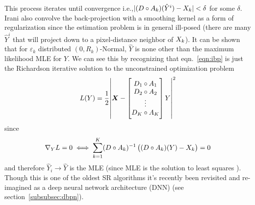 %
This process iterates until convergence i.e.,\(\lvert (D \circ A_k)(\hat{Y}^i) - X_k \rvert < \delta\) for some \(\delta\).
%
Irani \etal \cite{Irani1991ImprovingRB} also convolve the back-projection with a smoothing kernel as a form of regularization since the estimation problem is in general ill-posed (there are many \(\hat{Y}^{i}\) that will project down to a pixel-distance neighbor of \(X_k\)).
%
It can be shown \cite{Elad1996} that for \(\varepsilon_k\) distributed \((0, R_k)\)-Normal, \(\hat{Y}\) is none other than the maximum likelihood MLE for \(Y\).
%
We can see this by recognizing that eqn.~\eqref{eqn:ibp} is just the Richardson iterative \cite{Anderssen:1972:RNM:891962} solution to the unconstrained optimization problem
\begin{equation}
    L(Y) = \frac{1}{2} \abs{ \bm{X} -  \begin{bmatrix}
            D_1 \circ A_1 \\
            D_2 \circ A_2 \\
            \vdots        \\
            D_K \circ A_K \\
        \end{bmatrix}  Y  }^2
    \label{eqn:l2regression}
\end{equation}
since
\begin{equation*}
    \nabla_{Y} L = 0
    \iff
    \sum_{k=1}^K (D \circ A_k)^{-1}\left( (D \circ A_k)(Y) - X_k \right) = 0
\end{equation*}
and therefore \(\hat{Y}_i \rightarrow \hat{Y}\) is the MLE (since MLE is the solution to least squares \cite{CaseBerg:01}).
%
Though this is one of the oldest SR algorithms it's recently been revisited and re-imagined as a deep neural network architecture (DNN) \cite{haris2018deep} (see section~\ref{subsubsec:dbpn}).
